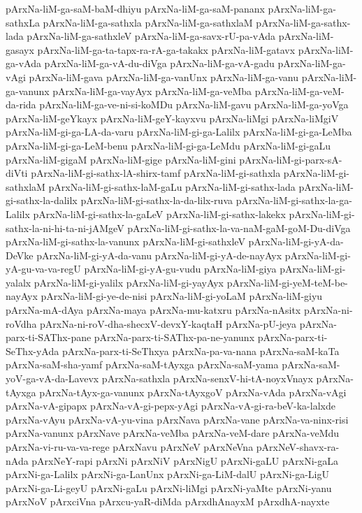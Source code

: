 {pArxNa-liM-ga-saM-baM-dhiyu
pArxNa-liM-ga-saM-pananx
pArxNa-liM-ga-sathxLa
pArxNa-liM-ga-sathxla
pArxNa-liM-ga-sathxlaM
pArxNa-liM-ga-sathx-lada
pArxNa-liM-ga-sathxleV
pArxNa-liM-ga-savx-rU-pa-vAda
pArxNa-liM-gasayx
pArxNa-liM-ga-ta-tapx-ra-rA-ga-takakx
pArxNa-liM-gatavx
pArxNa-liM-ga-vAda
pArxNa-liM-ga-vA-du-diVga
pArxNa-liM-ga-vA-gadu
pArxNa-liM-ga-vAgi
pArxNa-liM-gava
pArxNa-liM-ga-vanUnx
pArxNa-liM-ga-vanu
pArxNa-liM-ga-vanunx
pArxNa-liM-ga-vayAyx
pArxNa-liM-ga-veMba
pArxNa-liM-ga-veM-da-rida
pArxNa-liM-ga-ve-ni-si-koMDu
pArxNa-liM-gavu
pArxNa-liM-ga-yoVga
pArxNa-liM-geYkayx
pArxNa-liM-geY-kayxvu
pArxNa-liMgi
pArxNa-liMgiV
pArxNa-liM-gi-ga-LA-da-varu
pArxNa-liM-gi-ga-Lalilx
pArxNa-liM-gi-ga-LeMba
pArxNa-liM-gi-ga-LeM-benu
pArxNa-liM-gi-ga-LeMdu
pArxNa-liM-gi-gaLu
pArxNa-liM-gigaM
pArxNa-liM-gige
pArxNa-liM-gini
pArxNa-liM-gi-parx-sA-diVti
pArxNa-liM-gi-sathx-lA-shirx-tamf
pArxNa-liM-gi-sathxla
pArxNa-liM-gi-sathxlaM
pArxNa-liM-gi-sathx-laM-gaLu
pArxNa-liM-gi-sathx-lada
pArxNa-liM-gi-sathx-la-dalilx
pArxNa-liM-gi-sathx-la-da-lilx-ruva
pArxNa-liM-gi-sathx-la-ga-Lalilx
pArxNa-liM-gi-sathx-la-gaLeV
pArxNa-liM-gi-sathx-lakekx
pArxNa-liM-gi-sathx-la-ni-hi-ta-ni-jAMgeV
pArxNa-liM-gi-sathx-la-va-naM-gaM-goM-Du-diVga
pArxNa-liM-gi-sathx-la-vanunx
pArxNa-liM-gi-sathxleV
pArxNa-liM-gi-yA-da-DeVke
pArxNa-liM-gi-yA-da-vanu
pArxNa-liM-gi-yA-de-nayAyx
pArxNa-liM-gi-yA-gu-va-va-regU
pArxNa-liM-gi-yA-gu-vudu
pArxNa-liM-giya
pArxNa-liM-gi-yalalx
pArxNa-liM-gi-yalilx
pArxNa-liM-gi-yayAyx
pArxNa-liM-gi-yeM-teM-be-nayAyx
pArxNa-liM-gi-ye-de-nisi
pArxNa-liM-gi-yoLaM
pArxNa-liM-giyu
pArxNa-mA-dAya
pArxNa-maya
pArxNa-mu-katxru
pArxNa-nAsitx
pArxNa-ni-roVdha
pArxNa-ni-roV-dha-shecxV-devxY-kaqtaH
pArxNa-pU-jeya
pArxNa-parx-ti-SAThx-pane
pArxNa-parx-ti-SAThx-pa-ne-yanunx
pArxNa-parx-ti-SeThx-yAda
pArxNa-parx-ti-SeThxya
pArxNa-pa-va-nana
pArxNa-saM-kaTa
pArxNa-saM-sha-yamf
pArxNa-saM-tAyxga
pArxNa-saM-yama
pArxNa-saM-yoV-ga-vA-da-Lavevx
pArxNa-sathxla
pArxNa-senxV-hi-tA-noyxVnayx
pArxNa-tAyxga
pArxNa-tAyx-ga-vanunx
pArxNa-tAyxgoV
pArxNa-vAda
pArxNa-vAgi
pArxNa-vA-gipapx
pArxNa-vA-gi-pepx-yAgi
pArxNa-vA-gi-ra-beV-ka-lalxde
pArxNa-vAyu
pArxNa-vA-yu-vina
pArxNava
pArxNa-vane
pArxNa-va-ninx-risi
pArxNa-vanunx
pArxNave
pArxNa-veMba
pArxNa-veM-dare
pArxNa-veMdu
pArxNa-vi-ru-va-va-rege
pArxNavu
pArxNeV
pArxNeVna
pArxNeV-shavx-ra-nAda
pArxNeY-rapi
pArxNi
pArxNiV
pArxNigU
pArxNi-gaLU
pArxNi-gaLa
pArxNi-ga-Lalilx
pArxNi-ga-LanUnx
pArxNi-ga-LiM-dalU
pArxNi-ga-LigU
pArxNi-ga-Li-geyU
pArxNi-gaLu
pArxNi-liMgi
pArxNi-yaMte
pArxNi-yanu
pArxNoV
pArxciVna
pArxcu-yaR-diMda
pArxdhAnayxM
pArxdhA-nayxte
}
